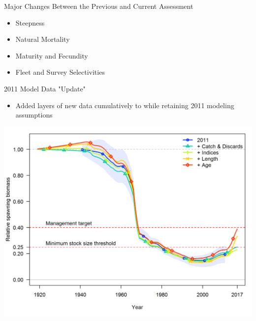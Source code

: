 \documentclass[pdf]{beamer}\usepackage[]{graphicx}\usepackage[]{color}
\begin{document}
\begin{frame}{Major Changes Between the Previous and Current Assessment}
  \begin{itemize}
    \item Steepness 
    \item Natural Mortality
    \item Maturity and Fecundity
    \item Fleet and Survey Selectivities 
  \end{itemize}
\end{frame}

\begin{frame}{2011 Model Data "Update"}
  \begin{itemize}
    \item Added layers of new data cumulatively to while retaining 2011 modeling assumptions
  \end{itemize}
  \begin{center}
    \includegraphics[scale = 0.42]{figures/Data_Bratio_uncertainty.png}
  \end{center}
\end{frame}
\end{document}
